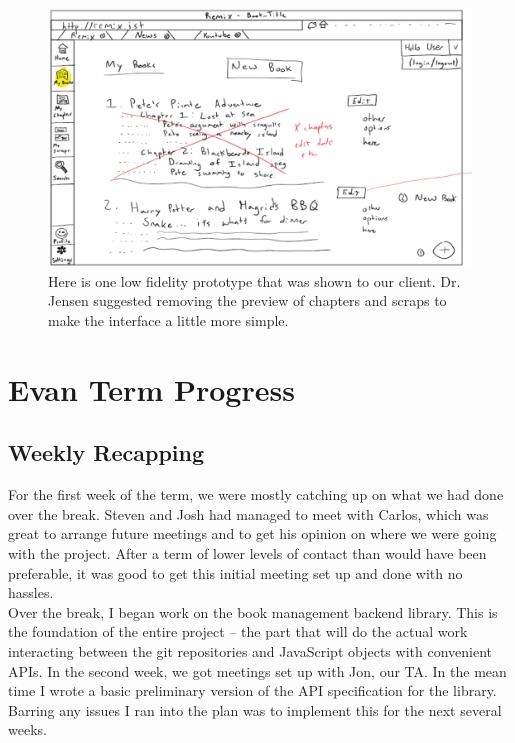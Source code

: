\documentclass[onecolumn, draftclsnofoot,10pt, compsoc]{IEEEtran}
\begin{document}
	\begin{figure}[ht!]
	\centering
	\includegraphics[width=140mm]{prototype}
	\caption{Here is one low fidelity prototype that was shown to our client. Dr. Jensen suggested 
	removing the preview of chapters and scraps to make the interface a little more simple.}
	\end{figure}	


\section{Evan Term Progress}

\subsection{Weekly Recapping}
\noindent For the first week of the term, we were mostly catching up on what we had done
over the break. Steven and Josh had managed to meet with Carlos, which was great
to arrange future meetings and to get his opinion on where we were going with
the project. After a term of lower levels of contact than would have been
preferable, it was good to get this initial meeting set up and done with no
hassles. \\

\noindent Over the break, I began work on the book management backend library. This is the
foundation of the entire project -- the part that will do the actual work
interacting between the git repositories and JavaScript objects with convenient
APIs. In the second week, we got meetings set up with Jon, our TA. In the mean time I
wrote a basic preliminary version of the API specification for the library.
Barring any issues I ran into the plan was to implement this for the next
several weeks. \\
\end{document}
